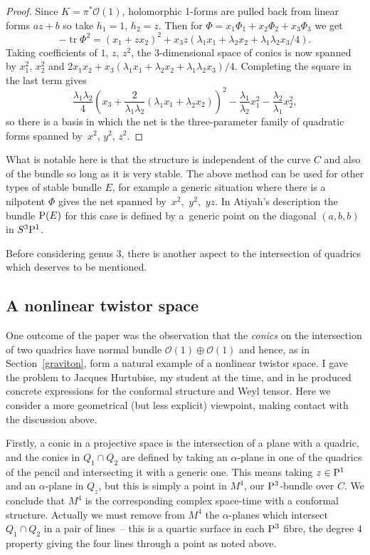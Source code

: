 \documentclass[10pt,a4paper]{amsart}
\numberwithin{equation}{section}
\begin{document}
\begin{proof}
Since $K=\pi^*\mathcal{O}(1)$, holomorphic 1-forms are pulled back from linear forms $az+b$ so take $h_1=1$, $h_2=z$. Then
for $\Phi=x_1\Phi_1+x_2\Phi_2+x_3\Phi_3$ we get
\[
-\operatorname{tr}\Phi^2=(x_1+zx_2)^2+x_3z( \lambda_1x_1+\lambda_2x_2 +\lambda_1\lambda_2x_3/4).
\] Taking coefficients of $1$, $z$, $z^2$, the $3$-dimensional space of conics is now spanned by
$x_1^2$, $x_2^2$ and $2x_1x_2+x_3(\lambda_1x_1+\lambda_2x_2+\lambda_1\lambda_2x_3)/4$.
Completing the square in the last term gives
\[
\frac{\lambda_1\lambda_2}{4}\left(x_3+\frac{2}{\lambda_1\lambda_2}(\lambda_1x_1+\lambda_2x_2)\right)^2-\frac{\lambda_1}{\lambda_2}x_1^2-\frac{\lambda_2}{\lambda_1} x_2^2,
\]
so there is a basis in which the net is the three-parameter family of quadratic forms spanned by~$x^2$, $y^2$, $z^2$.
\end{proof}

\begin{Remark} What is notable here is that the structure is independent of the curve $C$ and also of the bundle so long as it is very stable. The above method
can be used for other types of stable bundle $E$, for example a generic situation where there is a nilpotent $\Phi$ gives the net spanned by~$x^2$,~$y^2$,~$yz$. In Atiyah's description the bundle ${\rm P}(E)$ for this case is defined by a~generic point on the diagonal $(a,b,b)$ in $S^3{\rm P}^1$.
\end{Remark}

Before considering genus $3$, there is another aspect to the intersection of quadrics which deserves to be mentioned.

\subsection{A nonlinear twistor space}
One outcome of the paper \cite{Hitchin1981} was the observation that the {\it conics} on the intersection of two quadrics have normal bundle $\mathcal{O}(1)\oplus \mathcal{O}(1)$ and hence, as in Section~\ref{graviton}, form a natural example of a nonlinear twistor space. I gave the problem to Jacques Hurtubise, my student at the time, and in \cite{Hurtubise} he produced concrete expressions for the conformal structure and Weyl tensor. Here we consider a more geometrical (but less explicit) viewpoint, making contact with the discussion above.

Firstly, a conic in a projective space is the intersection of a plane with a quadric, and the conics in $Q_1\cap Q_2$ are defined by taking an $\alpha$-plane in one of the quadrics of the pencil and intersecting it with a generic one. This means taking $z\in {\rm P}^1$ and an $\alpha$-plane in $Q_z$, but this is simply a point in $M^4$, our ${\rm P}^3$-bundle over $C$. We conclude that $M^4$ is the corresponding complex space-time with a conformal structure. Actually we must remove from $M^4$ the $\alpha$-planes which intersect $Q_1\cap Q_2$ in a pair of lines~-- this is a quartic surface in each ${\rm P}^3$ fibre, the degree $4$ property giving the four lines through a point as noted above.
\end{document}
